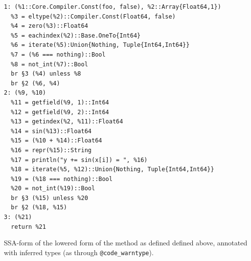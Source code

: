 \begin{lstfloat}[t]
\begin{lstlisting}[style=lstfloat]
1: (%1::Core.Compiler.Const(foo, false), %2::Array{Float64,1})
  %3 = eltype(%2)::Compiler.Const(Float64, false)
  %4 = zero(%3)::Float64
  %5 = eachindex(%2)::Base.OneTo{Int64}
  %6 = iterate(%5):Union{Nothing, Tuple{Int64,Int64}}
  %7 = (%6 === nothing)::Bool
  %8 = not_int(%7)::Bool
  br §3 (%4) unless %8
  br §2 (%6, %4)
2: (%9, %10)
  %11 = getfield(%9, 1)::Int64
  %12 = getfield(%9, 2)::Int64
  %13 = getindex(%2, %11)::Float64
  %14 = sin(%13)::Float64
  %15 = (%10 + %14)::Float64
  %16 = repr(%15)::String
  %17 = println("y += sin(x[i]) = ", %16)
  %18 = iterate(%5, %12)::Union{Nothing, Tuple{Int64,Int64}}
  %19 = (%18 === nothing)::Bool
  %20 = not_int(%19)::Bool
  br §3 (%15) unless %20
  br §2 (%18, %15)
3: (%21)
  return %21
\end{lstlisting}
  \caption{SSA-form of the lowered form of the method \protect{} as
    defined defined above, annotated with inferred types (as through
    \texttt{@code\_warntype}).\label{lst:foo-inferred}}
\end{lstfloat}

